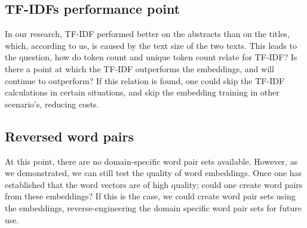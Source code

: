 \documentclass[runningheads]{llncs}
\begin{document}
\subsection{TF-IDFs performance point}
In our research, TF-IDF performed better on the abstracts than on the titles, which, according to us, is caused by the text size of the two texts. This leads to the question, how do token count and unique token count relate for TF-IDF? Is there a point at which the TF-IDF outperforms the embeddings, and will continue to outperform? If this relation is found, one could skip the TF-IDF calculations in certain situations, and skip the embedding training in other scenario's, reducing costs.
\subsection{Reversed word pairs}
At this point, there are no domain-specific word pair sets available. However, as we demonstrated, we can still test the quality of word embeddings. Once one has established that the word vectors are of high quality; could one create word pairs from these embeddings? If this is the case, we could create word pair sets using the embeddings, reverse-engineering the domain specific word pair sets for future use.


\end{document}
